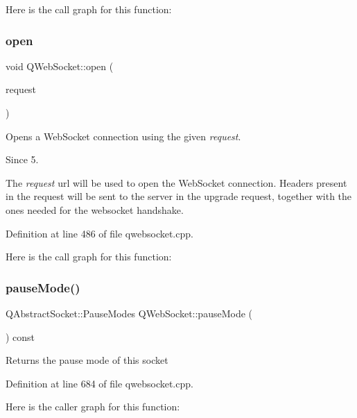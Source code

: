 Here is the call graph for this function\+:
\mbox{\label{class_q_web_socket_a7f321a0eb76101df28f9f3ebefa0ee3d}} 
\subsubsection{\texorpdfstring{open}{open}\hspace{0.1cm}{\footnotesize\ttfamily [2/2]}}
{\footnotesize\ttfamily void Q\+Web\+Socket\+::open (\begin{DoxyParamCaption}\item[{const Q\+Network\+Request \&}]{request }\end{DoxyParamCaption})\hspace{0.3cm}{\ttfamily [slot]}}



Opens a Web\+Socket connection using the given {\itshape request}. 

\begin{DoxySince}{Since}
5.
\end{DoxySince}
The {\itshape request} url will be used to open the Web\+Socket connection. Headers present in the request will be sent to the server in the upgrade request, together with the ones needed for the websocket handshake. 

Definition at line 486 of file qwebsocket.\+cpp.

Here is the call graph for this function\+:
\mbox{\label{class_q_web_socket_a15778b8a5f6ffb83c61b5e9b1701eb28}} 
\subsubsection{\texorpdfstring{pause\+Mode()}{pauseMode()}}
{\footnotesize\ttfamily Q\+Abstract\+Socket\+::\+Pause\+Modes Q\+Web\+Socket\+::pause\+Mode (\begin{DoxyParamCaption}{ }\end{DoxyParamCaption}) const}

Returns the pause mode of this socket 

Definition at line 684 of file qwebsocket.\+cpp.

Here is the caller graph for this function\+:
\mbox{\label{class_q_web_socket_a7788b65ef72c825dc9ffcb314c20ef4d}} 

